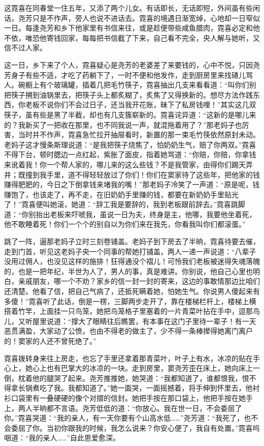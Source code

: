 \par 这霓喜在同春堂一住五年，又添了两个儿女。有话即长，无话即短，外间虽有些闲话，尧芳只是不作声，旁人也说不进话去。霓喜的境遇日渐宽绰，心地却一日窄似一日。每逢尧芳和乡下他家里有书信来往，或是趁便带些咸鱼腊肉，霓喜必定和他不依，唯恐他寄钱回家，每每把书信截了下来，自己看不完全，央人解与她听，又信不过人家。
\par 这一日，乡下来了个人，霓喜疑心是尧芳的老婆差了来要钱的，心中不悦，只因尧芳身子有些不适，才吃了药躺下了，一时不便和他发作，走到厨房里来找碴儿骂人。碗橱上有个玻璃罐，插着几把毛竹筷子，霓喜抽出几支来看看道：“叫你们别把筷子搠到油锅里去，把筷子头上都炙糊了，炙焦了又得换新的。想尽方法作践东西，你老板不说你们不会过日子，还当我开花账，昧下了私房钱哩！”其实这几双筷子，虽有些是黑了半截，却也有几支簇崭新的。霓喜诧异道：“这新的是哪儿来的？我新买了一把收在那里，也不同我说一声，就混拖着用了？”那老妈子也厉害，当时并不作声，霓喜急忙拉开抽屉看时，新置的那一束毛竹筷依然原封未动。老妈子这才慢条斯理说道：“是我把筷子烧焦了，怕奶奶生气，赔了你两双。”霓喜不得下台，顿时腮边一点红起，紫胀了面皮，指着她骂道：“你赔，你赔，你拿钱来讹着我！你一个帮人家的，哪儿来的这么些钱？不是我管家，由得你们踢天弄井；既撞到我手里，道不得轻轻放过了你们！你们在窦家待了这些年，把他家的钱赚得肥肥的，今日之下倒拿钱来堵我的嘴！”那老妈子冷笑了一声道：“原是呢，钱赚饱了，也该走了，再不走，在旧奶奶手里赚的钱，都要在新奶奶手里贴光了！”霓喜便叫她滚，她道：“辞工我是要辞的，我到老板跟前辞去。”霓喜跳脚道：“你别抬出老板来吓唬我，虽说一日为夫，终身是主，他哪，我要他坐着死，他不敢睡着死！你们一个个的别自以为你们来在我先，你看我叫你们都滚蛋。”
\par 跳了一阵，逼那老妈子立时三刻卷铺盖。老妈子到下房去了半晌，霓喜待要去催，走到门首，听见这老妈子央一个同事的帮她打铺盖，两人一递一声说道：“八辈子没用过佣人，也没见这样的施排！狂得通没个褶儿！可怜我们老板被迷得失魂落魄的，也是一把年纪，半世为人了，男人的事，真是难讲。你别说，他自己心里也明白，亲戚朋友，哪一个不劝？家乡的信一封一封的寄来，这边的事敢情那边比咱们还清楚。他看了信，把自己气病了，还抵死瞒着她，怕她生气。你说男人傻起来有多傻！”霓喜听了此话，倒是一楞，三脚两步走开了，靠在楼梯栏杆上，楼梯上横搭着竹竿，上面挂一只鸟笼，她把鸟笼格子里塞着的一片青菜叶拈在手中，逗那鸟儿，又听屋里说道：“撑大了眼睛往后瞧罢，有本事在这门子里待一辈子！有一天恶贯满盈，大家动了公愤，也由不得老的做主了，少不得一条棒撵得她离门离户的！窦家的人还不曾死绝了。”
\par 霓喜拨转身来往上房走，也忘了手里还拿着那青菜叶，叶子上有水，冰凉的贴在手心上，她心上也有巴掌大的冰凉的一块。走到房里，窦尧芳歪在床上，她向床上一倒，枕着他的腿哭了起来。尧芳推推她，她哭道：“我都知道了，谁都恨我，恨不得拿长锅煮吃了我。我都知道了。”她一面哭，一面摇撼着，将手伸到怀里去，他衬衫口袋里有一叠硬硬的像个对摺的信封。她把手按在那口袋上，他把手按在她手上，两人半晌都不言语。尧芳低低的道：“你放心。我在世一日，不会委屈了你。”霓喜哭道：“我的亲人，有一天你要有个山高水低……”尧芳道：“我死了，也不会委屈了你。当初你跟我的时候，我怎么说来？你安心便了，我自有处置。”霓喜呜咽道：“我的亲人……”自此恩爱愈深。
